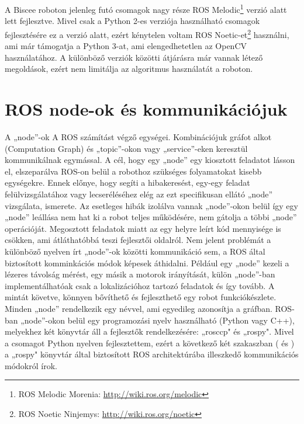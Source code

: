 A Biscee roboton jelenleg futó csomagok nagy része ROS Melodic\footnote{ROS Melodic Morenia: \url{http://wiki.ros.org/melodic}} verzió alatt lett fejlesztve. Mivel csak a Python 2-es verziója használható csomagok fejlesztésére ez a verzió alatt, ezért kénytelen voltam ROS Noetic-et\footnote{ROS Noetic Ninjemys: \url{http://wiki.ros.org/noetic}} használni, ami már támogatja a Python 3-at, ami elengedhetetlen az OpenCV használatához. A különböző verziók közötti átjárásra már vannak létező megoldások, ezért nem limitálja az algoritmus használatát a roboton.

\section{ROS node-ok és kommunikációjuk}
A „node”-ok A ROS számítást végző egységei. Kombinációjuk gráfot alkot (Computation Graph) és „topic”-okon vagy „service”-eken keresztül kommunikálnak egymással. A cél, hogy egy „node” egy kiosztott feladatot lásson el, elszeparálva ROS-on belül a robothoz szükséges folyamatokat kisebb egységekre. Ennek előnye, hogy segíti a hibakeresést, egy-egy feladat felülvizsgálatához vagy lecseréléséhez elég az ezt specifikusan ellátó „node” vizsgálata, ismerete. Az esetleges hibák izolálva vannak „node”-okon belül így egy „node” leállása nem hat ki a robot teljes működésére, nem gátolja a többi „node” operációját. Megosztott feladatok miatt az egy helyre leírt kód mennyisége is csökken, ami átláthatóbbá teszi fejlesztői oldalról. Nem jelent problémát a különböző nyelven írt „node”-ok közötti kommunikáció sem, a ROS által biztosított komminkációs módok képesek áthidalni. Például egy „node” kezeli a lézeres távolság mérést, egy másik a motorok irányítását, külön „node”-ban implementálhatóak csak a lokalizációhoz tartozó feladatok és így tovább. A mintát követve, könnyen bővíthető és fejleszthető egy robot funkciókészlete.
Minden „node” rendelkezik egy névvel, ami egyedileg azonosítja a gráfban. ROS-ban „node”-okon belül egy programozási nyelv használható (Python vagy C++), melyekhez két könyvtár áll a fejlesztők rendelkezésére: „rosccp" és „rospy". Mivel a csomagot Python nyelven fejlesztettem, ezért a következő két szakaszban ( és ) a „rospy" könyvtár által biztosított ROS architektúrába illeszkedő kommunikációs módokról írok.

